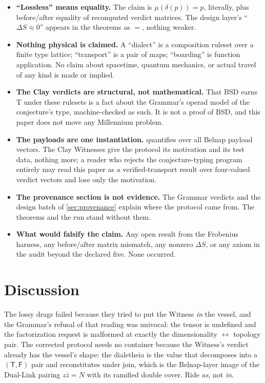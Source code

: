 \documentclass[12pt,a4paper]{article}
\newcommand{\bT}{\textsf{T}}
\newcommand{\bF}{\textsf{F}}
\begin{document}
\begin{itemize}
\item \textbf{``Lossless'' means equality.} The claim is
$\mu(\delta(p)) = p$, literally, plus before/after equality of recomputed
verdict matrices. The design layer's ``$\Delta S \approx 0$'' appears in
the theorems as $=$, nothing weaker.
\item \textbf{Nothing physical is claimed.} A ``dialect'' is a composition
ruleset over a finite type lattice; ``transport'' is a pair of maps;
``boarding'' is function application. No claim about spacetime, quantum
mechanics, or actual travel of any kind is made or implied.
\item \textbf{The Clay verdicts are structural, not mathematical.} That
BSD earns \bT{} under these rulesets is a fact about the Grammar's
operad model of the conjecture's type, machine-checked as such. It is
not a proof of BSD, and this paper does not move any Millennium problem.
\item \textbf{The payloads are one instantiation.} 
quantifies over all Belnap payload vectors. The Clay Witnesses give the
protocol its motivation and its test data, nothing more; a reader who
rejects the conjecture-typing program entirely may read this paper as a
verified-transport result over four-valued verdict vectors and lose only
the motivation.
\item \textbf{The provenance section is not evidence.} The Grammar
verdicts and the design batch of \cref{sec:provenance} explain where the
protocol came from. The theorems and the run stand without them.
\item \textbf{What would falsify the claim.} Any open result from the
Frobenius harness, any before/after matrix mismatch, any nonzero
$\Delta S$, or any axiom in the audit beyond the declared five. None
occurred.
\end{itemize}

\section{Discussion}

The lossy drags failed because they tried to put the Witness \emph{in} the
vessel, and the Grammar's refusal of that reading was univocal: the tensor
is undefined and the factorization request is malformed at exactly the
dimensionality $\leftrightarrow$ topology pair. The corrected protocol needs no
container because the Witness's verdict already has the vessel's shape:
the dialetheia is the value that decomposes into a $(\bT,\bF)$ pair and
reconstitutes under join, which is the Belnap-layer image of the Dual-Link
pairing $z\bar{z} = N$ with its ramified double cover. Ride \emph{as},
not \emph{in}.
\end{document}
